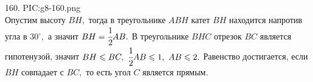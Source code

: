 160. {{PIC:g8-160.png}}\\
Опустим высоту $BH,$ тогда в треугольнике $ABH$ катет $BH$ находится напротив угла в $30^\circ,$ а значит $BH=\cfrac{1}{2}AB.$ В треугольнике $BHC$ отрезок $BC$ является гипотенузой, значит $BH\leqslant BC,\ \cfrac{1}{2}AB \leqslant 1,\ AB \leqslant2.$ Равенство достигается, если $BH$ совпадает с $BC,$ то есть угол $C$ является прямым.\\
